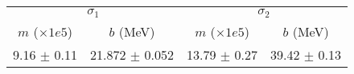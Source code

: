 \begin{tabular}{cc|cc}
\multicolumn{2}{c|}{$\sigma_1$} & \multicolumn{2}{|c}{$\sigma_2$} \\
$m$ ($\times1e5$) & $b$ (MeV) & $m$ ($\times1e5$) & $b$ (MeV) \\
\hline
9.16 $\pm$ 0.11 & 21.872 $\pm$ 0.052 & 13.79 $\pm$ 0.27 & 39.42 $\pm$ 0.13\\
\end{tabular}
